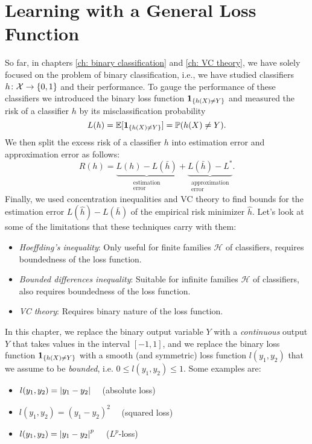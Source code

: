 \chapter{Learning with a General Loss Function}

So far, in chapters \ref{ch: binary classification} and \ref{ch: VC theory}, we have solely focused on the problem of binary classification, i.e., we have studied classifiers $h \colon \mathcal{X} \to \set{0, 1}$ and their performance. To gauge the performance of these classifiers we introduced the binary loss function $\indSet{h(X) \neq Y}$ and measured the risk of a classifier $h$ by its misclassification probability
\[
    L(h) = \Exp[\indSet{h(X) \neq Y}] = \P(h(X) \neq Y).
\]
We then split the excess risk of a classifier $h$ into estimation error and approximation error as follows:
\[
    R(h) = \underbrace{L(h) - L(\bar{h})}_{\substack{\text{estimation} \\ \text{error}}} + \underbrace{L(\bar{h}) - L^*}_{\substack{\text{approximation} \\ \text{error}}}.
\]
Finally, we used concentration inequalities and VC theory to find bounds for the estimation error $L(\hat{h}) - L(\bar{h})$ of the empirical risk minimizer $\hat{h}$. Let's look at some of the limitations that these techniques carry with them:

\begin{itemize}
    \item \emph{Hoeffding's inequality}: Only useful for finite families $\mathcal{H}$ of classifiers, requires boundedness of the loss function.

    \item \emph{Bounded differences inequality}: Suitable for infinite families $\mathcal{H}$ of classifiers, also requires boundedness of the loss function.

    \item \emph{VC theory}: Requires binary nature of the loss function.
\end{itemize}

In this chapter, we replace the binary output variable $Y$ with a \emph{continuous} output $Y$ that takes values in the interval $[-1, 1]$, and we replace the binary loss function $\indSet{h(X) \neq Y}$ with a smooth (and symmetric) loss function $l(y_1, y_2)$ that we assume to be \emph{bounded}, i.e. $0 \leq l(y_1, y_2) \leq 1$. Some examples are:

\begin{itemize}
    \item $l(y_1, y_2) = \abs{y_1 - y_2} \quad$ (absolute loss)
    
    \item $l(y_1, y_2) = (y_1 - y_2)^2 \quad$ (squared loss)

    \item $l(y_1, y_2) = \abs{y_1 - y_2}^p \quad$ ($L^p$-loss)
\end{itemize}

